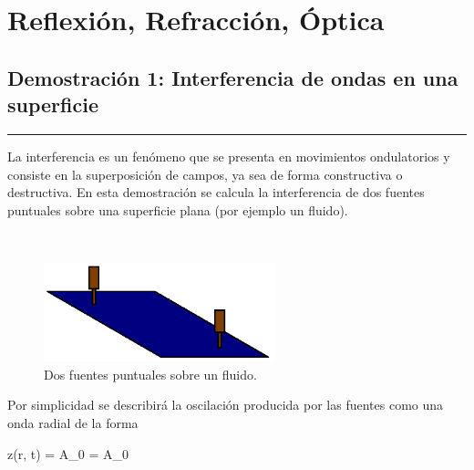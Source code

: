 \chapter{Reflexión, Refracción, Óptica}
\label{cha:optic}





\section{Demostración 1: Interferencia de ondas en una superficie}
\label{sec:DEMO4_01}
\rule{14cm}{0.5mm}

La interferencia es un fenómeno que se presenta en movimientos ondulatorios
y consiste en la superposición de campos, ya sea de forma constructiva o 
destructiva. En esta demostración se calcula la interferencia de dos fuentes
puntuales sobre una superficie plana (por ejemplo un fluido).


\
\begin{figure}[htbp]
	\centering
	\includegraphics[width=0.60\textwidth]
	{./pictures/interference.png}

	\caption{\small{Dos fuentes puntuales sobre un fluido.}}
	
	\label{fig:doppler}
\end{figure}


Por simplicidad se describirá la oscilación producida por las fuentes como
una onda radial de la forma

{z(r, t) = A_0\sin{} = A_0\sin{}}

